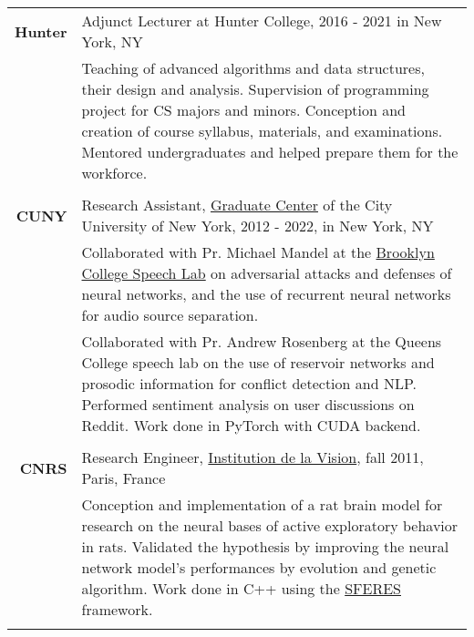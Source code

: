 \documentclass[a4paper,10pt]{article}
\begin{document}
\begin{tabular}{r|p{160mm}}
        \textbf{Hunter} & Adjunct Lecturer at Hunter College, 2016 - 2021 in New York, NY\\
        & \small{Teaching of advanced algorithms and data structures, their design and analysis. Supervision of programming project for CS majors and minors. Conception and creation of course syllabus, materials, and examinations. Mentored undergraduates and helped prepare them for the workforce. }\\
        \multicolumn{2}{c}{} \vspace{-1.5mm} \\
        
        \textbf{CUNY} & Research Assistant, \href{https://www.gc.cuny.edu/}{Graduate Center} of the City University of New York, 2012 - 2022, in New York, NY \\
        & \small{Collaborated with Pr. Michael Mandel at the \href{https://www.gc.cuny.edu/CUNY_GC/media/Computer-Science/SpeechLab.pdf}{Brooklyn College Speech Lab} on adversarial attacks and defenses of neural networks, and the use of recurrent neural networks for audio source separation.}\\
        & \small{Collaborated with Pr. Andrew Rosenberg at the Queens College speech lab on the use of reservoir networks and prosodic information for conflict detection and NLP. Performed sentiment analysis on user discussions on Reddit. Work done in PyTorch with CUDA backend.}\\
        \multicolumn{2}{c}{} \vspace{-1.5mm} \\

        \textbf{CNRS} & Research Engineer, \href{https://www.institut-vision.org/index.php/en/research/aging-vision-and-action}{Institution de la Vision}, fall 2011, Paris, France\\
        & \small{Conception and implementation of a rat brain model for research on the neural bases of active exploratory behavior in rats. Validated the hypothesis by improving the neural network model's performances by evolution and genetic algorithm. Work done in C++ using the \href{https://github.com/sferes2/sferes2}{SFERES} framework.}\\
        \multicolumn{2}{c}{} \vspace{-1.5mm} \\
        

\end{tabular}
\end{document}
